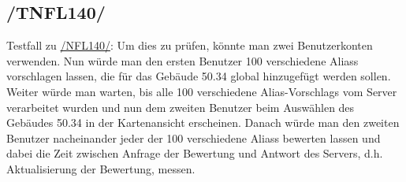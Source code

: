 \subsection*{/TNFL140/}
\label{/TNFL140/} Testfall zu \hyperref[/NFL140/]{/NFL140/}: Um dies zu prüfen, könnte man zwei \Gls{Benutzer}konten verwenden. Nun würde man den ersten \Gls{Benutzer} 100 verschiedene \Glspl{Alias} vorschlagen lassen, die für das Gebäude 50.34 \gls{global} hinzugefügt werden sollen. Weiter würde man warten, bis alle 100 verschiedene \Glspl{Alias-Vorschlag} vom \Gls{Server} verarbeitet wurden und nun dem zweiten \Gls{Benutzer} beim Auswählen des Gebäudes 50.34 in der \Gls{Kartenansicht} erscheinen. Danach würde man den zweiten \Gls{Benutzer} nacheinander jeder der 100 verschiedene \Glspl{Alias} bewerten lassen und dabei die Zeit zwischen Anfrage der Bewertung und Antwort des \Gls{Server}s, d.h. Aktualisierung der Bewertung, messen.